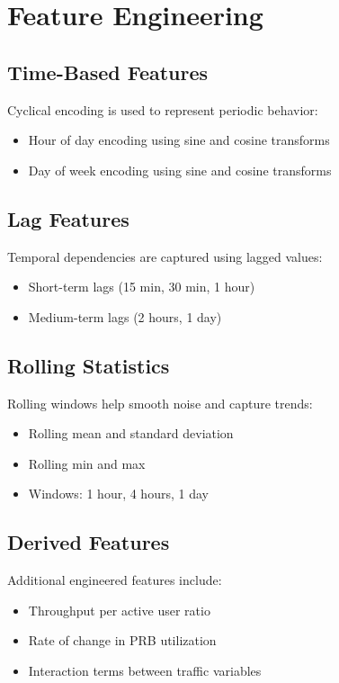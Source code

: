 \documentclass[conference]{IEEEtran}
\begin{document}
\section{Feature Engineering}

\subsection{Time-Based Features}
Cyclical encoding is used to represent periodic behavior:
\begin{itemize}
\item Hour of day encoding using sine and cosine transforms
\item Day of week encoding using sine and cosine transforms
\end{itemize}

\subsection{Lag Features}
Temporal dependencies are captured using lagged values:
\begin{itemize}
\item Short-term lags (15 min, 30 min, 1 hour)
\item Medium-term lags (2 hours, 1 day)
\end{itemize}

\subsection{Rolling Statistics}
Rolling windows help smooth noise and capture trends:
\begin{itemize}
\item Rolling mean and standard deviation
\item Rolling min and max
\item Windows: 1 hour, 4 hours, 1 day
\end{itemize}

\subsection{Derived Features}
Additional engineered features include:
\begin{itemize}
\item Throughput per active user ratio
\item Rate of change in PRB utilization
\item Interaction terms between traffic variables
\end{itemize}
\end{document}
